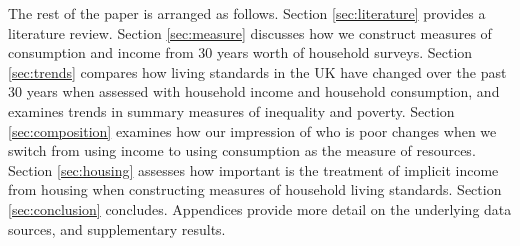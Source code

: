 The rest of the paper is arranged as follows.  Section \ref{sec:literature} provides a literature review. Section \ref{sec:measure} discusses how we construct measures of consumption and income from 30 years worth of household surveys.  Section \ref{sec:trends} compares how living standards in the UK have changed over the past 30 years when assessed with household income and household consumption, and examines trends in summary measures of inequality and poverty. Section \ref{sec:composition} examines how our impression of who is poor changes when we switch from using income to using consumption as the measure of resources. Section \ref{sec:housing} assesses how important is the treatment of implicit income from housing when constructing measures of household living standards. Section \ref{sec:conclusion} concludes. Appendices provide more detail on the underlying data sources, and supplementary results.
